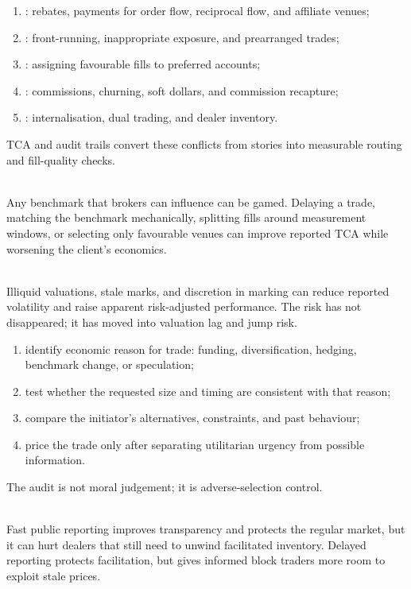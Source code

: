 \begin{taxonomy} 
\begin{enumerate}[label=\roman*.]
\setlength{\itemsep}{0pt}
\item {}: rebates, payments for order flow, reciprocal flow, and affiliate venues;
\item {}: front-running, inappropriate exposure, and prearranged trades;
\item {}: assigning favourable fills to preferred accounts;
\item {}: commissions, churning, soft dollars, and commission recapture;
\item {}: internalisation, dual trading, and dealer inventory.
\end{enumerate}
TCA and audit trails convert these conflicts from stories into measurable routing and fill-quality checks.
\end{taxonomy}

\begin{caveat} \\
Any benchmark that brokers can influence can be gamed. Delaying a trade, matching the benchmark mechanically, splitting fills around measurement windows, or selecting only favourable venues can improve reported TCA while worsening the client's economics.
\end{caveat}

\begin{caveat} \\
Illiquid valuations, stale marks, and discretion in marking can reduce reported volatility and raise apparent risk-adjusted performance. The risk has not disappeared; it has moved into valuation lag and jump risk.
\end{caveat}

\begin{process} 
\begin{enumerate}[label=\roman*.]
\setlength{\itemsep}{0pt}
\item identify economic reason for trade: funding, diversification, hedging, benchmark change, or speculation;
\item test whether the requested size and timing are consistent with that reason;
\item compare the initiator's alternatives, constraints, and past behaviour;
\item price the trade only after separating utilitarian urgency from possible information.
\end{enumerate}
The audit is not moral judgement; it is adverse-selection control.
\end{process}

\begin{caveat} \\
Fast public reporting improves transparency and protects the regular market, but it can hurt dealers that still need to unwind facilitated inventory. Delayed reporting protects facilitation, but gives informed block traders more room to exploit stale prices.
\end{caveat}
